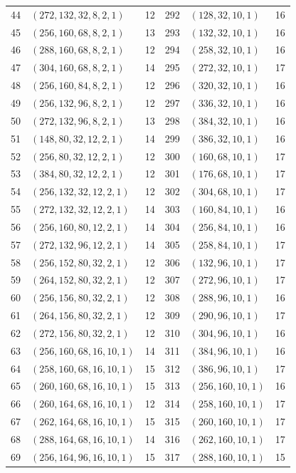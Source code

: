 \begin{longtable}{@{}rlr@{\hspace{12mm}}rlr@{}}
44 & $(272,132,32,8,2,1)$ & 12 & 292 & $(128,32,10,1)$ & 16\\
45 & $(256,160,68,8,2,1)$ & 13 & 293 & $(132,32,10,1)$ & 16\\
46 & $(288,160,68,8,2,1)$ & 12 & 294 & $(258,32,10,1)$ & 16\\
47 & $(304,160,68,8,2,1)$ & 14 & 295 & $(272,32,10,1)$ & 17\\
48 & $(256,160,84,8,2,1)$ & 12 & 296 & $(320,32,10,1)$ & 16\\
49 & $(256,132,96,8,2,1)$ & 12 & 297 & $(336,32,10,1)$ & 16\\
50 & $(272,132,96,8,2,1)$ & 13 & 298 & $(384,32,10,1)$ & 16\\
51 & $(148,80,32,12,2,1)$ & 14 & 299 & $(386,32,10,1)$ & 16\\
52 & $(256,80,32,12,2,1)$ & 12 & 300 & $(160,68,10,1)$ & 17\\
53 & $(384,80,32,12,2,1)$ & 12 & 301 & $(176,68,10,1)$ & 17\\
54 & $(256,132,32,12,2,1)$ & 12 & 302 & $(304,68,10,1)$ & 17\\
55 & $(272,132,32,12,2,1)$ & 14 & 303 & $(160,84,10,1)$ & 16\\
56 & $(256,160,80,12,2,1)$ & 14 & 304 & $(256,84,10,1)$ & 16\\
57 & $(272,132,96,12,2,1)$ & 14 & 305 & $(258,84,10,1)$ & 17\\
58 & $(256,152,80,32,2,1)$ & 12 & 306 & $(132,96,10,1)$ & 17\\
59 & $(264,152,80,32,2,1)$ & 12 & 307 & $(272,96,10,1)$ & 17\\
60 & $(256,156,80,32,2,1)$ & 12 & 308 & $(288,96,10,1)$ & 16\\
61 & $(264,156,80,32,2,1)$ & 12 & 309 & $(290,96,10,1)$ & 17\\
62 & $(272,156,80,32,2,1)$ & 12 & 310 & $(304,96,10,1)$ & 16\\
63 & $(256,160,68,16,10,1)$ & 14 & 311 & $(384,96,10,1)$ & 16\\
64 & $(258,160,68,16,10,1)$ & 15 & 312 & $(386,96,10,1)$ & 17\\
65 & $(260,160,68,16,10,1)$ & 15 & 313 & $(256,160,10,1)$ & 16\\
66 & $(260,164,68,16,10,1)$ & 12 & 314 & $(258,160,10,1)$ & 17\\
67 & $(262,164,68,16,10,1)$ & 15 & 315 & $(260,160,10,1)$ & 17\\
68 & $(288,164,68,16,10,1)$ & 14 & 316 & $(262,160,10,1)$ & 17\\
69 & $(256,164,96,16,10,1)$ & 15 & 317 & $(288,160,10,1)$ & 15\\

\end{longtable}
